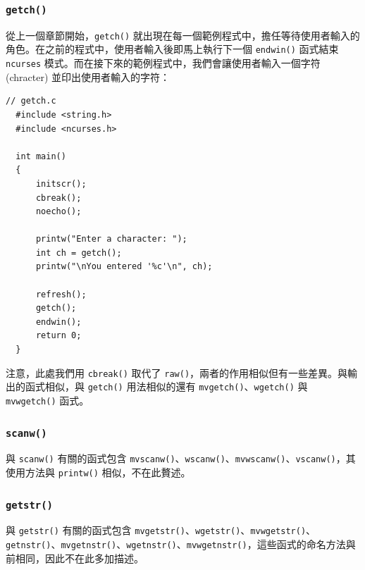 \documentclass[12pt]{article}
\theoremstyle{definition}
\begin{document}
\subsubsection{\texttt{getch()}}
\noindent
從上一個章節開始，\texttt{getch()} 就出現在每一個範例程式中，擔任等待使用者輸入的角色。在之前的程式中，使用者輸入後即馬上執行下一個 \texttt{endwin()} 函式結束 \texttt{ncurses} 模式。而在接下來的範例程式中，我們會讓使用者輸入一個字符 (chracter) 並印出使用者輸入的字符：
\begin{lstlisting}[style=C]
  // getch.c
  #include <string.h>
  #include <ncurses.h>

  int main()
  {
      initscr();
      cbreak();
      noecho();
    
      printw("Enter a character: ");
      int ch = getch();
      printw("\nYou entered '%c'\n", ch);
    
      refresh();
      getch();
      endwin();
      return 0;
  }
\end{lstlisting}
注意，此處我們用 \texttt{cbreak()} 取代了 \texttt{raw()}，兩者的作用相似但有一些差異。與輸出的函式相似，與 \texttt{getch()} 用法相似的還有 \texttt{mvgetch()}、\texttt{wgetch()} 與 \texttt{mvwgetch()} 函式。

\subsubsection{\texttt{scanw()}}
與 \texttt{scanw()} 有關的函式包含 \texttt{mvscanw()}、\texttt{wscanw()}、\texttt{mvwscanw()}、\texttt{vscanw()}，其使用方法與 \texttt{printw()} 相似，不在此贅述。

\subsubsection{\texttt{getstr()}}
與 \texttt{getstr()} 有關的函式包含 \texttt{mvgetstr()}、\texttt{wgetstr()}、\texttt{mvwgetstr()}、\texttt{getnstr()}、\texttt{mvgetnstr()}、\texttt{wgetnstr()}、\texttt{mvwgetnstr()}，這些函式的命名方法與前相同，因此不在此多加描述。
\end{document}
